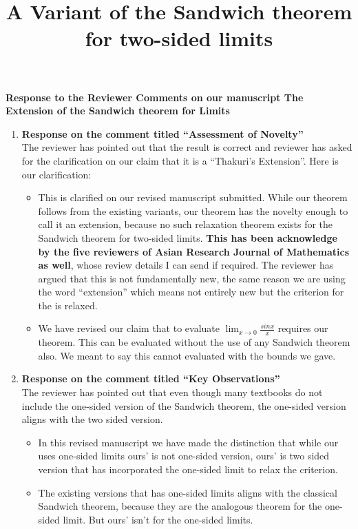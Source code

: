 \documentclass[a4paper,twoside,12pt]{article}
\title{\bfseries A Variant of the Sandwich theorem for two-sided limits}
\begin{document}
\begin{center}
{\large  \bfseries Response to the Reviewer Comments on our manuscript The Extension of the Sandwich theorem for Limits}
\end{center}
\vspace{3mm}
\begin{enumerate}
\item \textbf{Response on the comment titled ``Assessment of Novelty'' } \\[2mm]
  The reviewer has pointed out that the result is correct and reviewer has asked for the clarification on our claim that it is a ``Thakuri's Extension''. Here is our clarification:
  \begin{itemize}
  \item
    This is clarified on our revised manuscript submitted. While our theorem follows from the existing variants, our theorem has the novelty enough to call it an extension, because no such relaxation theorem exists for the Sandwich theorem for two-sided limits. \textbf{This has been acknowledge by the five reviewers of Asian Research Journal of Mathematics as well}, whose review details I can send if required. The reviewer has argued that this is not fundamentally new, the same reason we are using the word ``extension'' which means not entirely new but the criterion for the is relaxed.

 \item We have revised our claim that to evaluate \(\displaystyle \lim_{x \to 0} \frac{sinx}{x}\) requires our theorem. This can be evaluated without the use of any Sandwich theorem also. We meant to say this cannot evaluated with the bounds we gave.
    \end{itemize}


\item \textbf{Response on the comment titled ``Key Observations'' } \\[2mm]
  The reviewer has pointed out that even though many textbooks do not include the one-sided version of the Sandwich theorem, the one-sided version aligns with the two sided version. \\[3mm]
  \begin{itemize}
  \item In this revised manuscript we have made the distinction that while our uses one-sided limits ours' is not one-sided version, ours' is two sided version that has incorporated the one-sided limit to relax the criterion.

    \item The existing versions that has one-sided limits aligns with the classical Sandwich theorem, because they are the analogous theorem for the one-sided limit. But ours' isn't for the one-sided limits.
  \end{itemize}


\end{enumerate}
\end{document}
